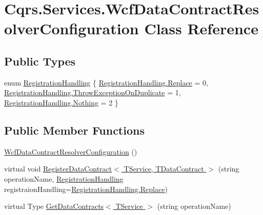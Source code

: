 \hypertarget{classCqrs_1_1Services_1_1WcfDataContractResolverConfiguration}{}\section{Cqrs.\+Services.\+Wcf\+Data\+Contract\+Resolver\+Configuration Class Reference}
\label{classCqrs_1_1Services_1_1WcfDataContractResolverConfiguration}
\subsection*{Public Types}
\begin{DoxyCompactItemize}
\item 
enum \hyperlink{classCqrs_1_1Services_1_1WcfDataContractResolverConfiguration_acf6a145eb88c5d98b31a541cfb1fb152_acf6a145eb88c5d98b31a541cfb1fb152}{Registration\+Handling} \{ \hyperlink{classCqrs_1_1Services_1_1WcfDataContractResolverConfiguration_acf6a145eb88c5d98b31a541cfb1fb152_acf6a145eb88c5d98b31a541cfb1fb152a0ebe6df8a3ac338e0512acc741823fdb}{Registration\+Handling.\+Replace} = 0, 
\hyperlink{classCqrs_1_1Services_1_1WcfDataContractResolverConfiguration_acf6a145eb88c5d98b31a541cfb1fb152_acf6a145eb88c5d98b31a541cfb1fb152a912a5d95306192c4f037d9e353d2a3ca}{Registration\+Handling.\+Throw\+Exception\+On\+Duplicate} = 1, 
\hyperlink{classCqrs_1_1Services_1_1WcfDataContractResolverConfiguration_acf6a145eb88c5d98b31a541cfb1fb152_acf6a145eb88c5d98b31a541cfb1fb152af80a4ad87fee7c9fdc19b7769495fdb5}{Registration\+Handling.\+Nothing} = 2
 \}
\end{DoxyCompactItemize}
\subsection*{Public Member Functions}
\begin{DoxyCompactItemize}
\item 
\hyperlink{classCqrs_1_1Services_1_1WcfDataContractResolverConfiguration_ac6853a244c867a60a64a223f6bcb6a55_ac6853a244c867a60a64a223f6bcb6a55}{Wcf\+Data\+Contract\+Resolver\+Configuration} ()
\item 
virtual void \hyperlink{classCqrs_1_1Services_1_1WcfDataContractResolverConfiguration_a3f0ed5ca3b65b2ca5a6c31c1e4d5e4ba_a3f0ed5ca3b65b2ca5a6c31c1e4d5e4ba}{Register\+Data\+Contract$<$ T\+Service, T\+Data\+Contract $>$} (string operation\+Name, \hyperlink{classCqrs_1_1Services_1_1WcfDataContractResolverConfiguration_acf6a145eb88c5d98b31a541cfb1fb152_acf6a145eb88c5d98b31a541cfb1fb152}{Registration\+Handling} registraion\+Handling=\hyperlink{classCqrs_1_1Services_1_1WcfDataContractResolverConfiguration_acf6a145eb88c5d98b31a541cfb1fb152_acf6a145eb88c5d98b31a541cfb1fb152a0ebe6df8a3ac338e0512acc741823fdb}{Registration\+Handling.\+Replace})
\item 
virtual Type \hyperlink{classCqrs_1_1Services_1_1WcfDataContractResolverConfiguration_a7e9e65b16d8f64da60e160ce60628e90_a7e9e65b16d8f64da60e160ce60628e90}{Get\+Data\+Contracts$<$ T\+Service $>$} (string operation\+Name)
\end{DoxyCompactItemize}
